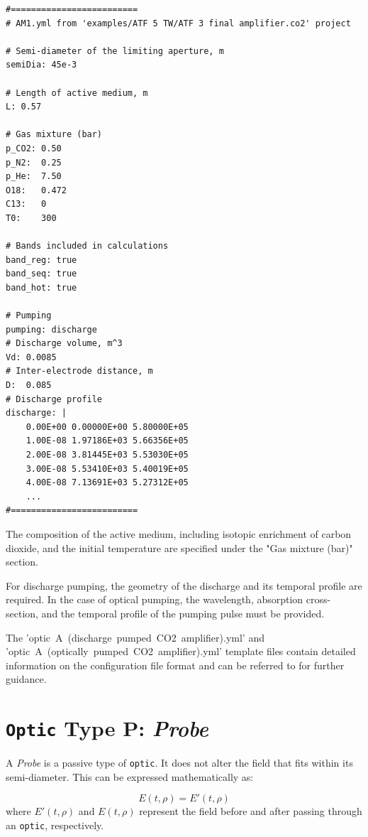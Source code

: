 \documentclass{report}
\begin{document}
\begin{verbatim}
#=========================
# AM1.yml from 'examples/ATF 5 TW/ATF 3 final amplifier.co2' project

# Semi-diameter of the limiting aperture, m
semiDia: 45e-3

# Length of active medium, m
L: 0.57

# Gas mixture (bar)
p_CO2: 0.50
p_N2:  0.25
p_He:  7.50
O18:   0.472
C13:   0
T0:    300

# Bands included in calculations
band_reg: true
band_seq: true
band_hot: true

# Pumping
pumping: discharge
# Discharge volume, m^3
Vd: 0.0085
# Inter-electrode distance, m
D:  0.085
# Discharge profile
discharge: |
    0.00E+00 0.00000E+00 5.80000E+05
    1.00E-08 1.97186E+03 5.66356E+05
    2.00E-08 3.81445E+03 5.53030E+05
    3.00E-08 5.53410E+03 5.40019E+05
    4.00E-08 7.13691E+03 5.27312E+05
    ...
#=========================
\end{verbatim}

The composition of the active medium, including isotopic enrichment of carbon dioxide, and the initial temperature are specified under the "Gas mixture (bar)" section.

For discharge pumping, the geometry of the discharge and its temporal profile are required. In the case of optical pumping, the wavelength, absorption cross-section, and the temporal profile of the pumping pulse must be provided.

The 'optic~A~(discharge~pumped~CO2~amplifier).yml' and 'optic~A~(optically~pumped~CO2~amplifier).yml' template files contain detailed information on the configuration file format and can be referred to for further guidance.


\section{\texttt{Optic} Type P: \textit{Probe}}
A \textit{Probe} is a passive type of \texttt{optic}. It does not alter the field that fits within its semi-diameter. This can be expressed mathematically as:

\begin{equation}
E(t,\rho) = E'(t,\rho)
\end{equation}
where \( E'(t,\rho) \) and \( E(t,\rho) \) represent the field before and after passing through an \texttt{optic}, respectively.
\end{document}

